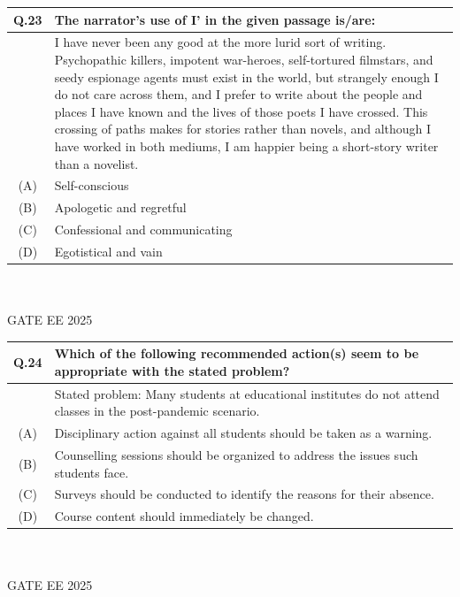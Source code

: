 \documentclass[journal,12pt,onecolumn]{IEEEtran}
\theoremstyle{remark}
\begin{document}
\begin{tabular}{|c|p{16cm}|}\hline
   Q.23 & The narrator's use of I' in the given passage is/are: \\    \hline


& I have never been any good at the more lurid sort of writing. Psychopathic killers, impotent war-heroes, self-tortured filmstars, and seedy espionage agents must exist in the world, but strangely enough I do not care across them, and I prefer to write about the people and places I have known and the lives of those poets I have crossed. This crossing of paths makes for stories rather than novels, and although I have worked in both mediums, I am happier being a short-story writer than a novelist.

 \\   \hline
  (A) & Self-conscious \\ \hline
(B) & Apologetic and regretful \\ \hline
(C) & Confessional and communicating \\ \hline
(D) & Egotistical and vain \\ \hline
\end{tabular} ~\\ \\
GATE EE 2025\\

\begin{tabular}{|c|p{16cm}|}\hline
   Q.24 & Which of the following recommended action(s) seem to be appropriate with the stated problem?  \\   \hline
     & Stated problem: Many students at educational institutes do not attend classes in the post-pandemic scenario. \\    \hline
  (A) & Disciplinary action against all students should be taken as a warning.\\     \hline
  (B) & Counselling sessions should be organized to address the issues such students face.\\  \hline
  (C) & Surveys should be conducted to identify the reasons for their absence.\\  \hline
  (D) & Course content should immediately be changed.\\  \hline
\end{tabular} ~\\ \\
GATE EE 2025\\
\end{document}
